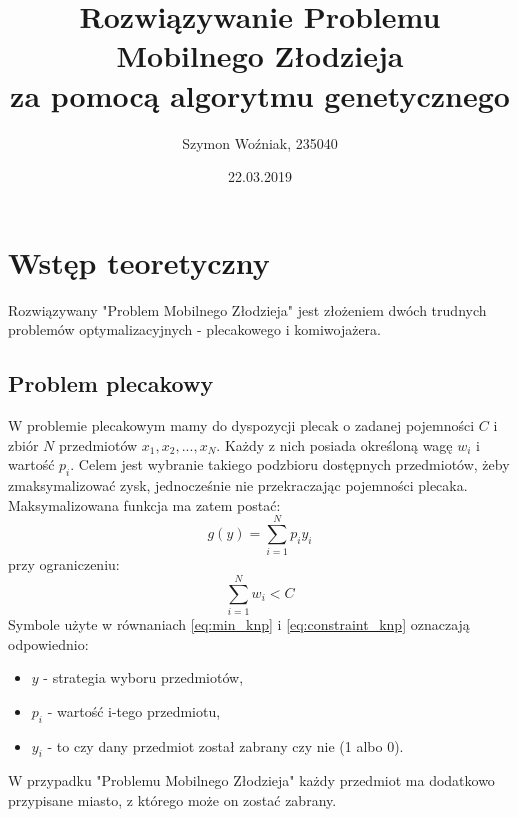 \documentclass{article}
\author{Szymon Woźniak, 235040}
\date{22.03.2019}
\title{Rozwiązywanie Problemu Mobilnego Złodzieja\\za pomocą algorytmu genetycznego}
\begin{document}
	\maketitle
	\newpage
	
	\section{Wstęp teoretyczny}
	Rozwiązywany "Problem Mobilnego Złodzieja" jest złożeniem dwóch trudnych problemów optymalizacyjnych - plecakowego i komiwojażera.
	\subsection{Problem plecakowy}
	W problemie plecakowym mamy do dyspozycji plecak o zadanej pojemności $C$ i zbiór $N$ przedmiotów ${x_{1}, x_{2}, ..., x_{N}}$. Każdy z nich posiada określoną wagę $w_{i}$ i wartość $p_{i}$. Celem jest wybranie takiego podzbioru dostępnych przedmiotów, żeby zmaksymalizować zysk, jednocześnie nie przekraczając pojemności plecaka. Maksymalizowana funkcja ma zatem postać:
	\begin{equation}\label{eq:min_knp}
		g(y) = \sum\limits_{i=1}^{N} p_{i}y_{i}
	\end{equation}
	przy ograniczeniu:
	\begin{equation}\label{eq:constraint_knp}
		\sum\limits_{i=1}^{N} w_{i} < C
	\end{equation}
	Symbole użyte w równaniach \ref{eq:min_knp} i \ref{eq:constraint_knp} oznaczają odpowiednio:
	\begin{itemize}
		\item $y$ - strategia wyboru przedmiotów,
		\item $p_{i}$ - wartość i-tego przedmiotu,
		\item $y_{i}$ - to czy dany przedmiot został zabrany czy nie (1 albo 0).
	\end{itemize}
	W przypadku "Problemu Mobilnego Złodzieja" każdy przedmiot ma dodatkowo przypisane miasto, z którego może on zostać zabrany.
\end{document}
